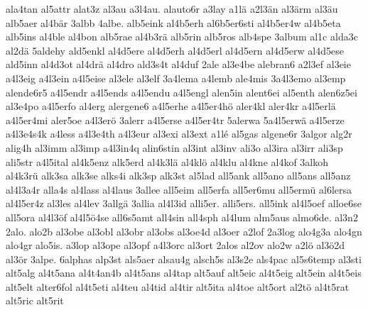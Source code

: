 {    ala4tan
    al5attr
    alat3z
    al3au
    a3l4au.
    alauto6r
    a3lay
    a1lä
    a2l3än
    al3ärm
    al3äu
    alb5aer
    al4bär
    3albb
    4albe.
    alb5eink
    al4b5erh
    al6b5er6sti
    al4b5er4w
    al4b5eta
    alb5ins
    al4ble
    al4bon
    alb5rae
    al4b3rä
    alb5rin
    alb5ros
    alb4spe
    3album
    al1c
    alda3c
    al2dä
    5aldehy
    ald5enkl
    al4d5ere
    al4d5erh
    al4d5erl
    al4d5ern
    al4d5erw
    al4d5ese
    ald5inn
    al4d3ot
    al4drä
    al4dro
    ald3s4t
    al4duf
    2ale
    al3e4be
    alebran6
    a2l3ef
    al3eie
    a4l3eig
    a4l3ein
    a4l5eise
    al3ele
    al3elf
    3a4lema
    a4lemb
    ale4mis
    3a4l3emo
    al3emp
    alende6r5
    a4l5endr
    a4l5ends
    a4l5endu
    a4l5engl
    alen5in
    alent6ei
    al5enth
    alen6z5ei
    al3e4po
    a4l5erfo
    al4erg
    alergene6
    a4l5erhe
    a4l5er4hö
    aler4kl
    aler4kr
    a4l5erlä
    a4l5er4mi
    aler5oe
    a4l3erö
    3alerr
    a4l5erse
    a4l5er4tr
    5alerwa
    5a4l5erwä
    a4l5erze
    a4l3e4s4k
    a4less
    a4l3e4th
    a4l3eur
    al3exi
    al3ext
    a1lé
    al5gas
    algene6r
    3algor
    alg2r
    alig4h
    al3imm
    al3imp
    a4l3in4q
    alin6stin
    al3int
    al3inv
    ali3o
    al3ira
    al3irr
    ali3sp
    ali5str
    a4l5ital
    al4k5enz
    alk5erd
    al4k3lä
    al4klö
    al4klu
    al4kne
    al4kof
    3alkoh
    al4k3rü
    alk3sa
    alk3se
    alks4i
    alk3sp
    alk3st
    al5lad
    all5ank
    all5ano
    all5ans
    all5anz
    al4l3a4r
    alla4s
    al4lass
    al4laus
    3allee
    all5eim
    all5erfa
    all5er6mu
    all5ermü
    al6lersa
    al4l5er4z
    al3les
    al4lev
    3allgä
    3allia
    al4l3id
    alli5er.
    alli5ers.
    all5ink
    al4l5oef
    alloe6se
    all5ora
    al4l3öf
    al4l5ö4se
    all6s5amt
    all4sin
    all4sph
    al4lum
    alm5aus
    almo6de.
    al3n2
    2alo.
    alo2b
    al3obe
    al3obl
    al3obr
    al3obs
    al3oe4d
    al3oer
    a2lof
    2a3log
    alo4g3a
    alo4gn
    alo4gr
    alo5is.
    a3lop
    al3ope
    al3opf
    a4l3orc
    al3ort
    2alos
    al2ov
    alo2w
    a2lö
    al3ö2d
    al3ör
    3alpe.
    6alphas
    alp3st
    als5aer
    alsau4g
    alsch5s
    al3s2e
    als4pac
    al5s6temp
    al3sti
    alt5alg
    al4t5ana
    al4t4an4b
    al4t5ans
    al4tap
    alt5auf
    alt5eic
    al4t5eig
    alt5ein
    al4t5eis
    alt5elt
    alter6fol
    al4t5eti
    al4teu
    al4tid
    al4tir
    alt5ita
    al4toe
    alt5ort
    al2tö
    al4t5rat
    alt5ric
    alt5rit
}
